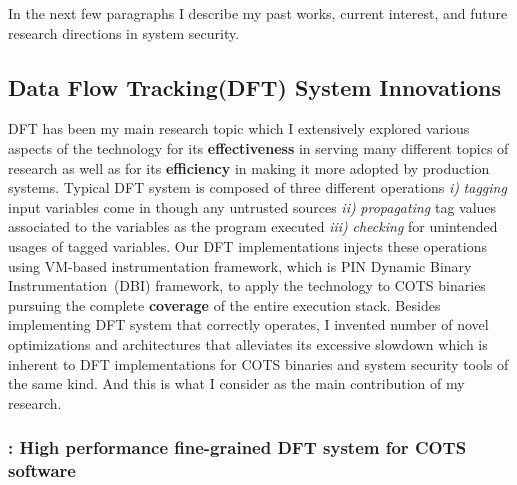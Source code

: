 \documentclass[letterpaper, 10pt]{article}
\begin{document}
\begin{small}
In the next few paragraphs I describe my past works, current interest, and
future research directions in system security.


\subsection*{Data Flow Tracking(DFT) System Innovations}
%
DFT has been my main research topic which I extensively explored various
aspects of the technology for its {\bf effectiveness} in serving many different
topics of research as well as for its {\bf efficiency} in making it more
adopted by production systems.
%
Typical DFT system is composed of three different operations {\it i)} {\it
tagging} input variables come in though any untrusted sources {\it ii)} {\it
propagating} tag values associated to the variables as the program executed
{\it iii)} {\it checking} for unintended usages of tagged variables. 
%
Our DFT implementations injects these operations using VM-based instrumentation
framework, which is PIN Dynamic Binary Instrumentation~(DBI) framework, to
apply the technology to COTS binaries pursuing the complete {\bf coverage} of
the entire execution stack.
%
Besides implementing DFT system that correctly operates, I invented number of
novel optimizations and architectures that alleviates its excessive slowdown
which is inherent to DFT implementations for COTS binaries and system security
tools of the same kind. And this is what I consider as the main contribution of
my research.

\subsubsection*{\libdft: High performance fine-grained DFT system for COTS
software}


\end{small}
\end{document}
